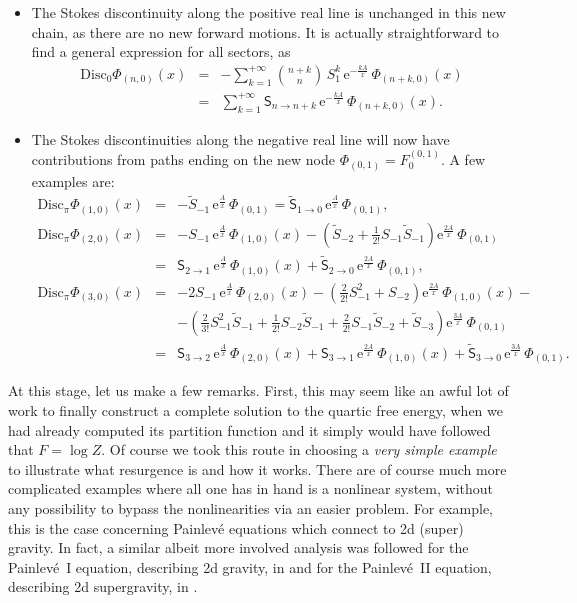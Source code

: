 \documentclass[11pt,a4paper]{article}
\newcommand{\bea}{\begin{eqnarray}}
\newcommand{\eea}{\end{eqnarray}}
\def\disc{{\mathrm{Disc}}}
\newcommand{\rme}{{\mathrm{e}}}
\begin{document}
\begin{itemize}
%
\item The Stokes discontinuity along the positive real line is unchanged in this new chain, as there are no new forward motions. It is actually straightforward to find a general expression for all sectors, as
%
\bea
\label{stokes-zero-pert-quartic}
\disc_{0} \Phi_{(n,0)} (x) &=& - \sum_{k=1}^{+\infty} \binom{n+k}{n}\, S_1^k\, \rme^{-\frac{kA}{x}}\, \Phi_{(n+k,0)} (x) \\
&=& \sum_{k=1}^{+\infty} \mathsf{S}_{n\to n+k}\, \rme^{-\frac{kA}{x}}\, \Phi_{(n+k,0)} (x). \nonumber
\eea
%
\item The Stokes discontinuities along the negative real line will now have contributions from paths ending on the new node $\Phi_{(0,1)} = F_0^{(0,1)}$. A few examples are:
%
\begin{eqnarray}
\label{stokes-pi-1inst-quartic}
\disc_{\pi} \Phi_{(1,0)}(x) &=& - \widetilde{S}_{-1}\, \rme^{\frac{A}{x}}\, \Phi_{(0,1)} = \widetilde{\mathsf{S}}_{1\to0}\, \rme^{\frac{A}{x}}\, \Phi_{(0,1)}, \\
\label{stokes-pi-2inst-quartic}
\disc_{\pi} \Phi_{(2,0)}(x) &=& - S_{-1}\, \rme^{\frac{A}{x}}\, \Phi_{(1,0)}(x) - \left( \widetilde{S}_{-2} + \frac{1}{2!} S_{-1} \widetilde{S}_{-1} \right) \rme^{\frac{2A}{x}}\, \Phi_{(0,1)} \\
&=& \mathsf{S}_{2\to1}\, \rme^{\frac{A}{x}}\, \Phi_{(1,0)}(x) + \widetilde{\mathsf{S}}_{2\to0}\, \rme^{\frac{2A}{x}}\, \Phi_{(0,1)}, \nonumber \\
\label{stokes-pi-3inst-quartic}
\disc_{\pi} \Phi_{(3,0)}(x) &=& - 2S_{-1}\, \rme^{\frac{A}{x}}\, \Phi_{(2,0)}(x) - \left( \frac{2}{2!} S_{-1}^2 + S_{-2} \right) \rme^{\frac{2A}{x}}\, \Phi_{(1,0)}(x) - \\
&&
- \left( \frac{2}{3!} S_{-1}^2 \widetilde{S}_{-1} + \frac{1}{2!} S_{-2} \widetilde{S}_{-1} + \frac{2}{2!} S_{-1} \widetilde{S}_{-2} + \widetilde{S}_{-3} \right) \rme^{\frac{3A}{x}}\, \Phi_{(0,1)} \nonumber \\
&=& \mathsf{S}_{3\to2}\, \rme^{\frac{A}{x}}\, \Phi_{(2,0)}(x) + \mathsf{S}_{3\to1}\, \rme^{\frac{2A}{x}}\, \Phi_{(1,0)}(x) + \widetilde{\mathsf{S}}_{3\to0}\, \rme^{\frac{3A}{x}}\, \Phi_{(0,1)}.
\nonumber
\end{eqnarray}
%
\end{itemize}

At this stage, let us make a few remarks. First, this may seem like an awful lot of work to finally construct a complete solution to the quartic free energy, when we had already computed its partition function and it simply would have followed that $F = \log Z$. Of course we took this route in choosing a \textit{very simple example} to illustrate what resurgence is and how it works. There are of course much more complicated examples where all one has in hand is a nonlinear system, without any possibility to bypass the nonlinearities via an easier problem. For example, this is the case concerning Painlev\'e equations which connect to 2d (super) gravity. In fact, a similar albeit more involved analysis was followed for the Painlev\'e~I equation, describing 2d gravity, in \cite{msw07, msw08, gikm10, asv11} and for the Painlev\'e~II equation, describing 2d supergravity, in \cite{m08, sv13}.
\end{document}
